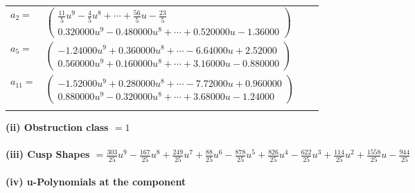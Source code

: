 \documentclass[1p]{elsarticle_modified}
\theoremstyle{definition}
\begin{document}
\begin{tabular}{m{7pt} m{180pt} m{7pt} m{180pt} }
\flushright $a_{2}=$&$\begin{pmatrix}\frac{11}{5} u^9-\frac{4}{5} u^8+\cdots+\frac{56}{5} u-\frac{23}{5}\\0.320000 u^{9}-0.480000 u^{8}+\cdots+0.520000 u-1.36000\end{pmatrix}$ \\
\flushright $a_{5}=$&$\begin{pmatrix}-1.24000 u^{9}+0.360000 u^{8}+\cdots-6.64000 u+2.52000\\0.560000 u^{9}+0.160000 u^{8}+\cdots+3.16000 u-0.880000\end{pmatrix}$ \\
\flushright $a_{11}=$&$\begin{pmatrix}-1.52000 u^{9}+0.280000 u^{8}+\cdots-7.72000 u+0.960000\\0.880000 u^{9}-0.320000 u^{8}+\cdots+3.68000 u-1.24000\end{pmatrix}$\\&\end{tabular}
\flushleft \textbf{(ii) Obstruction class $= 1$}\\~\\
\flushleft \textbf{(iii) Cusp Shapes $= \frac{303}{25} u^9-\frac{167}{25} u^8+\frac{249}{25} u^7+\frac{88}{25} u^6-\frac{878}{25} u^5+\frac{826}{25} u^4-\frac{622}{25} u^3+\frac{114}{25} u^2+\frac{1558}{25} u-\frac{944}{25}$}\\~\\
\newpage\renewcommand{\arraystretch}{1}
\flushleft \textbf{(iv) u-Polynomials at the component}\newline \\
\end{document}
